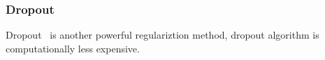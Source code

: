 \subsubsection{Dropout}

Dropout~\cite{JMLR:v15:srivastava14a} is another powerful regulariztion method, dropout algorithm is  computationally less expensive. 